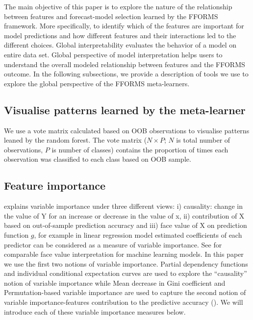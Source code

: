 \documentclass[11pt,a4paper,]{article}
\begin{document}
The main objective of this paper is to explore the nature of the relationship between features and forecast-model selection learned by the FFORMS framework. More specifically, to identify which of the features are important for model predictions and how different features and their interactions led to the different choices. Global interpretability evaluates the behavior of a model on entire data set. Global perspective of model interpretation helps users to understand the overall modeled relationship between features and the FFORMS outcome. In the following subsections, we provide a description of tools we use to explore the global perspective of the FFORMS meta-learners.

\hypertarget{visualise-patterns-learned-by-the-meta-learner}{%
\subsection{Visualise patterns learned by the meta-learner}\label{visualise-patterns-learned-by-the-meta-learner}}

We use a vote matrix calculated based on OOB observations to visualise patterns leaned by the random forest. The vote matrix (\(N \times P\); \(N\) is total number of observations, \(P\) is number of classes) contains the proportion of times each observation was classified to each class based on OOB sample.

\hypertarget{feature-importance}{%
\subsection{Feature importance}\label{feature-importance}}

\textcite{jiang2002} explains variable importance under three different views: i) causality: change in the value of Y for an increase or decrease in the value of x, ii) contribution of X based on out-of-sample prediction accuracy and iii) face value of X on prediction function \(g\), for example in linear regression model estimated coefficients of each predictor can be considered as a measure of variable importance. See \textcite{jiang2002} for comparable face value interpretation for machine learning models. In this paper we use the first two notions of variable importance. Partial dependency functions and individual conditional expectation curves are used to explore the ``causality'' notion of variable importance while Mean decrease in Gini coefficient and Permutation-based variable importance are used to capture the second notion of variable importance-features contribution to the predictive accuracy (\textcite{Zhao}). We will introduce each of these variable importance measures below.
\end{document}
